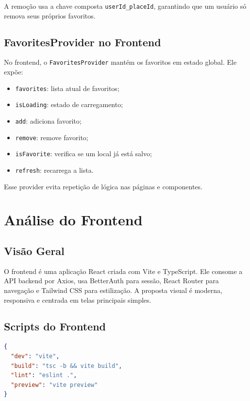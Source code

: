 \documentclass[
    12pt,
    oneside,
    openright,
    a4paper,
    english,
    brazil
]{abntex2}
\begin{document}
A remoção usa a chave composta \texttt{userId\_placeId}, garantindo que um usuário só remova seus próprios favoritos.

\section{FavoritesProvider no Frontend}

No frontend, o \texttt{FavoritesProvider} mantém os favoritos em estado global. Ele expõe:

\begin{itemize}
    \item \texttt{favorites}: lista atual de favoritos;
    \item \texttt{isLoading}: estado de carregamento;
    \item \texttt{add}: adiciona favorito;
    \item \texttt{remove}: remove favorito;
    \item \texttt{isFavorite}: verifica se um local já está salvo;
    \item \texttt{refresh}: recarrega a lista.
\end{itemize}

Esse provider evita repetição de lógica nas páginas e componentes.


\chapter{Análise do Frontend}

\section{Visão Geral}

O frontend é uma aplicação React criada com Vite e TypeScript. Ele consome a API backend por Axios, usa BetterAuth para sessão, React Router para navegação e Tailwind CSS para estilização. A proposta visual é moderna, responsiva e centrada em telas principais simples.

\section{Scripts do Frontend}

\begin{lstlisting}[language=json, caption={Scripts principais do frontend}]
{
  "dev": "vite",
  "build": "tsc -b && vite build",
  "lint": "eslint .",
  "preview": "vite preview"
}
\end{lstlisting}
\end{document}
